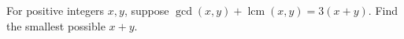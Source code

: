 For positive integers $x,y$, suppose $\gcd(x,y)+\operatorname{lcm}(x,y)=3(x+y)$. Find the smallest possible $x+y$.
